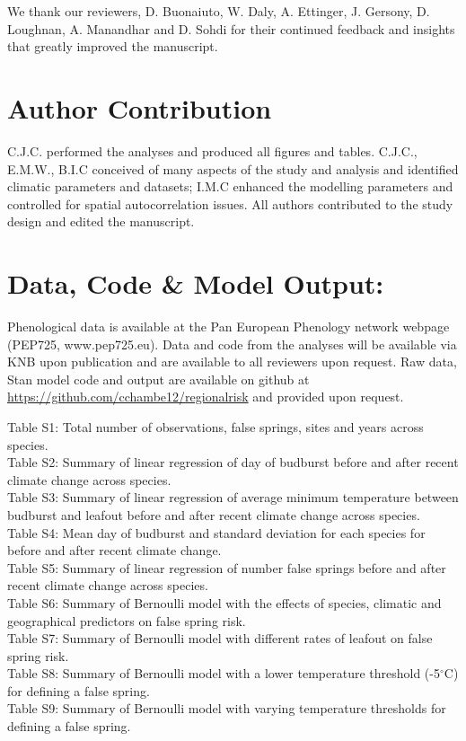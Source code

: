 \documentclass{article}\usepackage[]{graphicx}\usepackage[]{color}
\begin{document}
We thank our reviewers, D. Buonaiuto, W. Daly, A. Ettinger, J. Gersony, D. Loughnan, A. Manandhar and D. Sohdi for their continued feedback and insights that greatly improved the manuscript.

\section*{Author Contribution}
C.J.C. performed the analyses and produced all figures and tables. C.J.C., E.M.W., B.I.C conceived of many aspects of the study and analysis and identified climatic parameters and datasets; I.M.C enhanced the modelling parameters and controlled for spatial autocorrelation issues. All authors contributed to the study design and edited the manuscript.

\section*{Data, Code \& Model Output:}
Phenological data is available at the Pan European Phenology network webpage (PEP725, www.pep725.eu). Data and code from the analyses will be available via KNB upon publication and are available to all reviewers upon request. Raw data, {Stan} model code and output are available on github at \url{https://github.com/cchambe12/regionalrisk} and provided upon request.



\newpage
Table S1: Total number of observations, false springs, sites and years across species. \\
Table S2: Summary of linear regression of day of budburst before and after recent climate change across species. \\
Table S3: Summary of linear regression of average minimum temperature between budburst and leafout before and after recent climate change across species. \\
Table S4:  Mean day of budburst and standard deviation for each species for before and after recent climate change. \\
Table S5: Summary of linear regression of number false springs before and after recent climate change across species. \\
Table S6: Summary of Bernoulli model with the effects of species, climatic and geographical predictors on false spring risk. \\
Table S7: Summary of Bernoulli model with different rates of leafout on false spring risk. \\
Table S8: Summary of Bernoulli model with a lower temperature threshold (-5$^{\circ}$C) for defining a false spring. \\
Table S9: Summary of Bernoulli model with varying temperature thresholds for defining a false spring. \\
\end{document}
